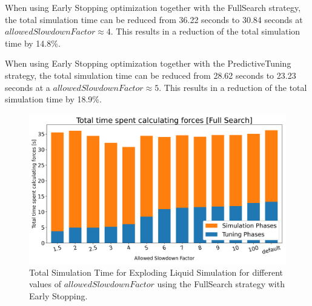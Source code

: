 \documentclass[conference]{IEEEtran}
\begin{document}
\begin{description}[style=nextline]
    \item[FullSearch (\autoref{fig:full_search})]
        When using Early Stopping optimization together with the FullSearch strategy, the total simulation time
        can be reduced from 36.22 seconds to 30.84 seconds at $allowedSlowdownFactor \approx4$. This results in a reduction of the total simulation time by 14.8\%.
    \item[PredictiveTuning (\autoref{fig:predictive_tuning})]
        When using Early Stopping optimization together with the PredictiveTuning strategy, the total simulation time can be reduced from 28.62 seconds to 23.23 seconds at a $allowedSlowdownFactor \approx5$. This results in a reduction of the total simulation time by 18.9\%.
\end{description}

\begin{figure}[H]
    \centering

    \includegraphics[width=\columnwidth]{../data/explodingLiquid/cluster/fullSearch/analytics/total_time_average.png}

    \caption{Total Simulation Time for Exploding Liquid Simulation for different values of $allowedSlowdownFactor$ using the FullSearch strategy with Early Stopping.}
    \label{fig:full_search}
\end{figure}
\end{document}
